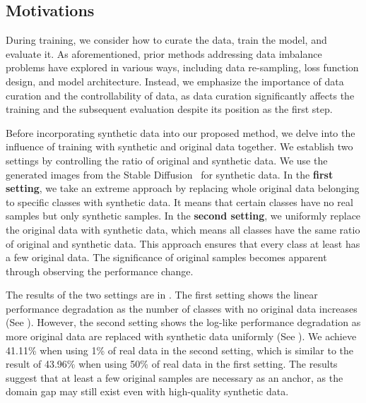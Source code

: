 \subsection{Motivations}\label{sec:2.1}
During training, we consider how to curate the data, train the model, and evaluate it.
As aforementioned, prior methods addressing data imbalance problems have explored in various ways, including data re-sampling, loss function design, and model architecture.
Instead, 
we emphasize the importance of data curation and the controllability of data, as data curation significantly affects the training and the subsequent evaluation despite its position as the first step.

Before incorporating synthetic data into our proposed method, we delve into the influence of training with synthetic and original data together.
We establish two settings by controlling the ratio of original and synthetic data.
We use the generated images from the Stable Diffusion~\cite{rombach2022high} for synthetic data.
In the \textbf{first setting}, we take an extreme approach by replacing whole original data belonging to specific classes with synthetic data.
It means that certain classes have no real samples but only synthetic samples.
In the \textbf{second setting}, we uniformly replace the original data with synthetic data, which means all classes have the same ratio of original and synthetic data.
This approach ensures that every class at least has a few original data.
The significance of original samples becomes apparent through observing the performance change.

The results of the two settings are in .
The first setting shows the linear performance degradation as the number of classes with no original data increases (See ).
However, the second setting shows the log-like performance degradation as more original data are replaced with synthetic data uniformly (See ).
We achieve 41.11\% when using 1\% of real data in the second setting, which is similar to the result of 43.96\% when using 50\% of real data in the first setting.
The results suggest that at least a few original samples are necessary as an anchor, as
the domain gap may still exist even with high-quality synthetic data.

